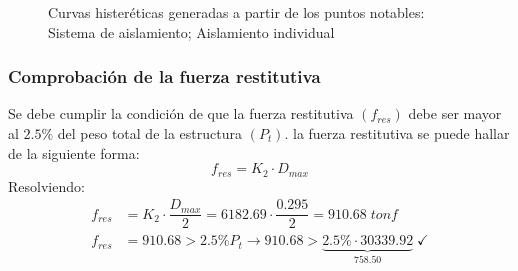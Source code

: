 \begin{figure}[h!]
\begin{subfigure}[b]{0.48\linewidth}
\caption{}
\label{i2_1.2}
\end{subfigure}
\caption[Curvas histeréticas generadas a partir de los puntos notables]{Curvas histeréticas generadas a partir de los puntos notables:
     Sistema de aislamiento;
     Aislamiento individual
}
\label{i2_1}
\end{figure}

\subsubsection{Comprobación de la fuerza restitutiva}
Se debe cumplir la condición de que la fuerza restitutiva $(f_{res})$ debe ser mayor al $2.5\%$ del peso total de la estructura $(P_t)$. la fuerza restitutiva se puede hallar de la siguiente forma:
\begin{equation}
    f_{res} = K_2 \cdot D_{max} \label{eq2_7}
\end{equation}
Resolviendo:
\begin{align*}
    f_{res} &= K_2 \cdot \dfrac{D_{max}}{2} = 6182.69 \cdot \dfrac{0.295}{2} = 910.68 \; tonf \\
    f_{res} &= 910.68 > 2.5\%P_t \rightarrow 910.68 > \underbrace{2.5\% \cdot 30339.92}_{758.50} \; \checkmark
\end{align*}
